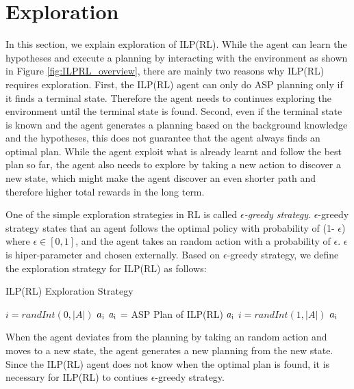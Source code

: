 
\section{Exploration}
\label{exploration}
In this section, we explain exploration of ILP(RL). While the agent can learn the hypotheses and execute a planning by interacting with the environment as shown in Figure \ref{fig:ILPRL_overview},
there are mainly two reasons why ILP(RL) requires exploration. 
First, the ILP(RL) agent can only do ASP planning only if it finds a terminal state. 
Therefore the agent needs to continues exploring the environment until the terminal state is found. 
Second, even if the terminal state is known and the agent generates a planning based on the background knowledge and the hypotheses, 
this does not guarantee that the agent always finds an optimal plan.
While the agent exploit what is already learnt and follow the best plan so far,
the agent also needs to explore by taking a new action to discover a new state, which might make the agent discover an even shorter path and therefore higher total rewards in the long term.

One of the simple exploration strategies in RL is called \textit{$\epsilon$-greedy strategy}.
$\epsilon$-greedy strategy states that an agent follows the optimal policy with probability of (1- $\epsilon$) where $\epsilon \in [0,1]$, 
and the agent takes an random action with a probability of $\epsilon$. $\epsilon$ is hiper-parameter and chosen externally.
Based on $\epsilon$-greedy strategy, we define the exploration strategy for ILP(RL) as follows:
\begin{algorithm}
\caption{ILP(RL) Exploration Strategy}\label{euclid}
\begin{algorithmic}[1]
\State
{}
\space
\State
{}
\State $i = randInt(0, |A|)$ 
\Return $a\textsubscript{i}$
\Else \State $a\textsubscript{i}$ = ASP Plan of ILP(RL)
\Return $a\textsubscript{i}$
\EndIf
\Else \State $i = randInt(1, |A|)$
\Return $a\textsubscript{i}$
\EndIf
\EndProcedure
\end{algorithmic}
\end{algorithm}
When the agent deviates from the planning by taking an random action and moves to a new state, the agent generates a new planning from the new state. 
Since the ILP(RL) agent does not know when the optimal plan is found, it is necessary for ILP(RL) to contiues $\epsilon$-greedy strategy.
